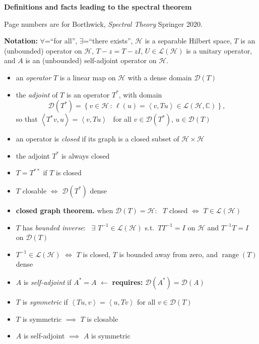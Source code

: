 \documentclass[11pt]{article}
\newcommand{\cD}{\mathcal{D}}
\newcommand{\cH}{\mathcal{H}}
\newcommand{\cL}{\mathcal{L}}
\newcommand{\CC}{\mathbb{C}}
\newcommand{\ip}[2]{\left<#1,#2\right>}
\newcommand{\range}{\operatorname{range}}
\begin{document}
\strut
\centerline{{\Large \textbf{Definitions and facts leading to the spectral theorem}}}

\normalsize
\medskip

Page numbers are for Borthwick, \emph{Spectral Theory} Springer 2020.

\textbf{Notation:} $\forall$=``for all'', $\exists$=``there exists'', $\cH$ is a separable Hilbert space, $T$ is an (unbounded) operator on $\cH$, $T-z=T-zI$, $U \in \cL(\cH)$ is a unitary operator, and $A$ is an (unbounded) self-adjoint operator on $\cH$.

\newcommand{\itwo}[2]{{\small \textbf{#1}} {\footnotesize p #2} \,\,}
\newcommand{\df}[1]{\,\itwo{def}{#1}}
\newcommand{\ft}[1]{\itwo{\underline{fact}}{#1}}

\begin{itemize}[leftmargin=10mm,itemsep=0mm]
\item[\df{36}] an \emph{operator} $T$ is a linear map on $\cH$ with a dense domain $\cD(T)$
\item[\df{38}] the \emph{adjoint} of $T$ is an operator $T^*$, with domain
	$$\cD(T^*) = \left\{v\in\cH\,:\,\ell(u)=\ip{v}{Tu} \in \cL(\cH,\CC)\right\},$$
so that $\ip{T^* v}{u} = \ip{v}{Tu}$ \, for all $v\in\cD(T^*)$, $u\in\cD(T)$
\item[\df{41}] an operator is \emph{closed} if its graph is a closed subset of $\cH\times \cH$
\item[\ft{43}] the adjoint $T^*$ is always closed
\item[\ft{44}] $T=T^{**}$ if $T$ is closed
\item[\ft{44}] $T$ closable $\iff$ $\cD(T^*)$ dense
\item[\ft{44}] \textbf{closed graph theorem.} when $\cD(T)=\cH$: \, $T$ closed $\iff$ $T\in\cL(\cH)$
\item[\df{46}] $T$ has \emph{bounded inverse}: \, $\exists$ $T^{-1}\in\cL(\cH)$ s.t.~$TT^{-1}=I$ on $\cH$ and $T^{-1}T=I$ on $\cD(T)$
\item[\ft{46}] $T^{-1}\in\cL(\cH)$ $\iff$ $T$ is closed, $T$ is bounded away from zero, and $\range(T)$ dense
\item[\df{47}] $A$ is \emph{self-adjoint} if $A^*=A$ \hfill {\footnotesize $\leftarrow$ \textbf{requires:} $\cD(A^*)=\cD(A)$}
\item[\df{47}] $T$ is \emph{symmetric} if $\ip{Tu}{v}=\ip{u}{Tv}$ for all $v\in\cD(T)$
\item[\ft{47}] $T$ is symmetric $\implies$ $T$ is closable
\item[\ft{47}] $A$ is self-adjoint $\implies$ $A$ is symmetric

\end{itemize}
\end{document}
